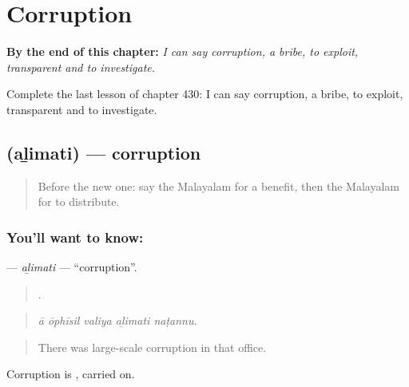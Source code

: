
\chapter{Corruption}
\label{ch:ml-corruption}

\begin{chapteropening}
\textbf{By the end of this chapter:} \emph{I can say corruption, a bribe, to exploit, transparent and to investigate.}

Complete the last lesson of chapter 430: I can say corruption, a bribe, to exploit, transparent and to investigate.
\end{chapteropening}

\section[\texorpdfstring{\ml{അഴിമതി} (aḻimati)}{അഴിമതി (aḻimati)}]{ (aḻimati) — corruption}

\label{lesson:ML-C430-alimati}



\begin{quote}
Before the new one: say the Malayalam for a benefit, then the Malayalam for to distribute.
\end{quote}

\subsection*{You'll want to know: }
\textbf{} — \emph{aḻimati} — \textquotedblleft{}corruption\textquotedblright{}.

\begin{quote}
    .
\end{quote}

\begin{quote}
\emph{ā ōphīsil valiya aḻimati naṭannu.}
\end{quote}

\begin{quote}
There was large-scale corruption in that office.
\end{quote}

Corruption is , carried on.

